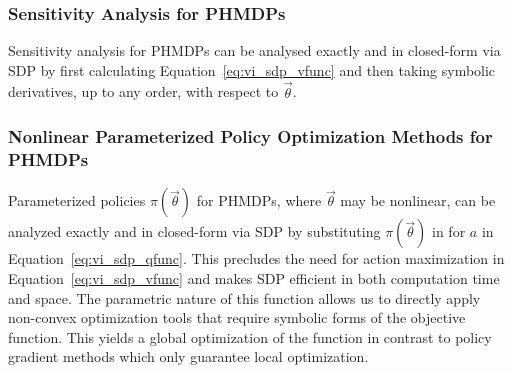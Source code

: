 \subsubsection{Sensitivity Analysis for PHMDPs}

Sensitivity analysis for PHMDPs can be analysed exactly and in closed-form via SDP by first calculating Equation~\eqref{eq:vi_sdp_vfunc} and then taking symbolic derivatives, up to any order, with respect to %
{\footnotesize $\vec{\theta}$}.

\subsubsection{Nonlinear Parameterized Policy Optimization Methods for PHMDPs}

Parameterized policies {\footnotesize $ \pi(\vec{\theta}) $} for PHMDPs, where {\footnotesize $\vec{\theta}$} may be nonlinear, can be analyzed exactly and in closed-form via SDP by substituting {\footnotesize $ \pi(\vec{\theta}) $} in for {\footnotesize  $ a $} in Equation~\eqref{eq:vi_sdp_qfunc}. This precludes the need for action maximization in Equation~\eqref{eq:vi_sdp_vfunc} and makes SDP efficient in both computation time and space. The parametric nature of this function allows us to directly apply non-convex optimization tools that require symbolic forms of the objective function. 
This yields a global optimization of the function in contrast to policy gradient methods which only guarantee local optimization.